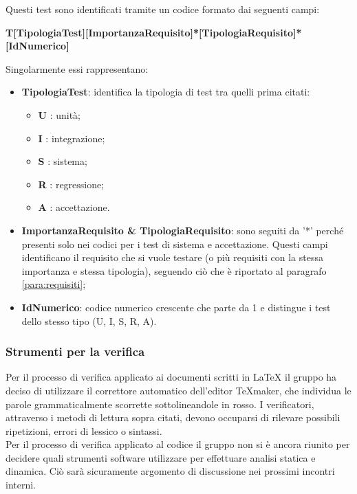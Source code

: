Questi test sono identificati tramite un codice formato dai seguenti campi:
\begin{center}
\textbf{T[TipologiaTest][ImportanzaRequisito]*[TipologiaRequisito]*[IdNumerico]} 
\end{center}
Singolarmente essi rappresentano:
\begin{itemize}
	\item \textbf{TipologiaTest}: identifica la tipologia di test tra quelli prima citati:
		\begin{itemize}
			\item \textbf{U} : unità;
			\item \textbf{I} : integrazione;
			\item \textbf{S} : sistema;
			\item \textbf{R} : regressione;
			\item \textbf{A} : accettazione.			 
		\end{itemize}
	\item \textbf{ImportanzaRequisito \& TipologiaRequisito}: sono seguiti da '*' perché presenti solo nei codici per i test di sistema e accettazione. Questi campi identificano il requisito che si vuole testare (o più requisiti con la stessa importanza e stessa tipologia), seguendo ciò che è riportato al paragrafo \ref{para:requisiti};
	\item \textbf{IdNumerico}: codice numerico crescente che parte da 1 e distingue i test dello stesso tipo (U, I, S, R, A).
\end{itemize}
 
\subsubsection{Strumenti per la verifica}
Per il processo di verifica applicato ai documenti scritti in \LaTeX{} il gruppo ha deciso di utilizzare il correttore automatico dell'editor TeXmaker, che individua le parole grammaticalmente scorrette sottolineandole in rosso. I verificatori, attraverso i metodi di lettura sopra citati, devono occuparsi di rilevare possibili ripetizioni, errori di lessico o sintassi.  \\
\linebreak
Per il processo di verifica applicato al codice il gruppo non si è ancora riunito per decidere quali strumenti software utilizzare per effettuare analisi statica e dinamica. Ciò sarà sicuramente argomento di discussione nei prossimi incontri interni.
















